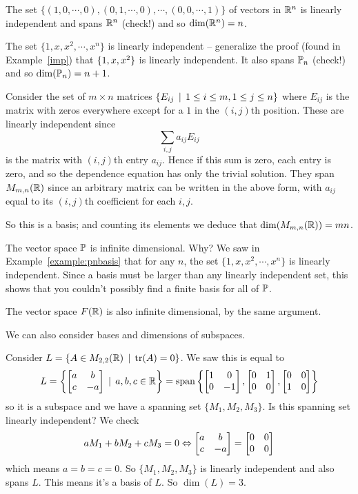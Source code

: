 \begin{myexample} The set $\{(1,0,\cdots, 0), (0,1,\cdots, 0), \cdots, (0,0, \cdots, 1)\}$
of vectors in $\mathbb{R}^n$ is linearly independent and spans $\mathbb{R}^n$ (check!) 
and so $\dim(\mathbb{R}^n) = n$.  \end{myexample}

\begin{myexample} \label{example:pnbasis} The set $\{1,x,x^2, \cdots, x^n\}$ is linearly independent -- generalize the proof (found in Example~\ref{imp}) that $\{1, x, x^2 \}$ is linearly independent.
It also  spans $\mathbb{P}_n$ (check!) and so $\dim(\mathbb{P}_n) = n+1$.  \end{myexample}

\begin{myexample} Consider the  set of $m \times n$ matrices $\{ E_{ij} \,\mid \, 1 \leq i \leq m, 1 \leq j \leq n\}$
where $E_{ij}$ is the matrix with zeros everywhere except for a $1$ in
the $(i,j)$th position.  These are linearly independent since
$$
\sum_{i,j} a_{ij}E_{ij}
$$
is the matrix with $(i,j)$th entry $a_{ij}$.  Hence if this sum is
zero, each entry is zero, and so the dependence equation has only the
trivial solution.  They span $M_{m,n}(\mathbb{R})$ since an arbitrary matrix
can be written in the above form, with $a_{ij}$ equal to its $(i,j)$th
coefficient for each $i,j$.

So this is a basis; and counting its elements we deduce that $\dim(M_{m,n}(\mathbb{R})) = mn$.  \end{myexample}

\begin{myexample} The vector space $\mathbb{P}$ is infinite dimensional.  Why? We saw in Example~\ref{example:pnbasis} that for
any $n$, the set $\{1,x,x^2, \cdots, x^n\}$ is linearly independent.  Since a basis must be larger than any linearly independent
set, this shows that you couldn't possibly find a finite basis for all of $\mathbb{P}$.  \end{myexample}

\begin{myexample} The vector space $F(\mathbb{R})$ is also infinite dimensional, by
the same argument.  \end{myexample}

We can also consider bases and dimensions of subspaces.

\begin{myexample} Consider $L = \{ A \in M_{2,2}(\mathbb{R}) \,\mid \, \operatorname{tr}(A) = 0\}$.  We saw
this is equal to 
$$
L = \left\{ \left[ \begin{matrix} a & b \\ c& -a \end{matrix} \right] \,\mid \, a,b,c\in \mathbb{R} \right\} = \textrm{span}\left\{ \left[ \begin{matrix} 1 & 0 \\ 0 & -1 \end{matrix} \right], \left[ \begin{matrix} 0 & 1\\ 0 & 0 \end{matrix} \right], \left[ \begin{matrix} 0 & 0 \\ 1 & 0 \end{matrix} \right]\right\}
$$
so it is a subspace and we have a spanning set $\{M_1, M_2, M_3\}$.  Is this spanning set
linearly independent?  We check
$$
aM_1 + bM_2 + cM_3 = 0 \Leftrightarrow \left[ \begin{matrix} a & b \\ c& -a \end{matrix} \right] = \left[ \begin{matrix} 0 & 0\\0 & 0 \end{matrix} \right]
$$
which means $a=b=c=0$.  So $\{M_1, M_2,M_3\}$ is linearly independent and
also spans $L$.  This means it's a basis of $L$.  So $\dim(L)=3$.  \end{myexample}

